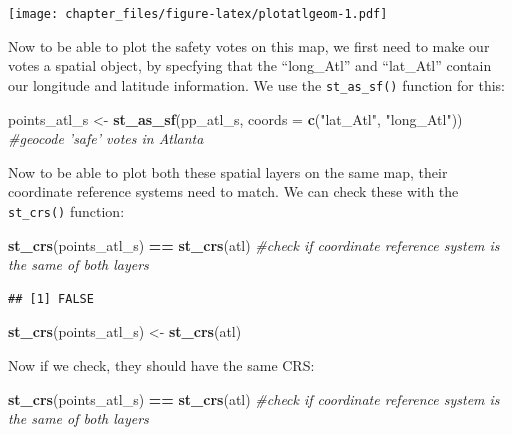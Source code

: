 \documentclass[
]{article}
\newenvironment{Shaded}{\begin{snugshade}}{\end{snugshade}}
\newcommand{\CommentTok}[1]{\textcolor[rgb]{0.56,0.35,0.01}{\textit{#1}}}
\newcommand{\DataTypeTok}[1]{\textcolor[rgb]{0.13,0.29,0.53}{#1}}
\newcommand{\KeywordTok}[1]{\textcolor[rgb]{0.13,0.29,0.53}{\textbf{#1}}}
\newcommand{\NormalTok}[1]{#1}
\newcommand{\OperatorTok}[1]{\textcolor[rgb]{0.81,0.36,0.00}{\textbf{#1}}}
\newcommand{\StringTok}[1]{\textcolor[rgb]{0.31,0.60,0.02}{#1}}
\begin{document}
\texttt{[image: chapter\_files/figure-latex/plotatlgeom-1.pdf]}

Now to be able to plot the safety votes on this map, we first need to
make our votes a spatial object, by specfying that the ``long\_Atl'' and
``lat\_Atl'' contain our longitude and latitude information. We use the
\texttt{st\_as\_sf()} function for this:

\begin{Shaded}
\begin{Highlighting}[]
\NormalTok{points_atl_s <-}\StringTok{ }\KeywordTok{st_as_sf}\NormalTok{(pp_atl_s, }\DataTypeTok{coords =} \KeywordTok{c}\NormalTok{(}\StringTok{"lat_Atl"}\NormalTok{, }\StringTok{"long_Atl"}\NormalTok{)) }\CommentTok{#geocode 'safe' votes in Atlanta}
\end{Highlighting}
\end{Shaded}

Now to be able to plot both these spatial layers on the same map, their
coordinate reference systems need to match. We can check these with the
\texttt{st\_crs()} function:

\begin{Shaded}
\begin{Highlighting}[]
\KeywordTok{st_crs}\NormalTok{(points_atl_s) }\OperatorTok{==}\StringTok{ }\KeywordTok{st_crs}\NormalTok{(atl) }\CommentTok{#check if coordinate reference system is the same of both layers}
\end{Highlighting}
\end{Shaded}

\begin{verbatim}
## [1] FALSE
\end{verbatim}

\begin{Shaded}
\begin{Highlighting}[]
\KeywordTok{st_crs}\NormalTok{(points_atl_s) <-}\StringTok{ }\KeywordTok{st_crs}\NormalTok{(atl)}
\end{Highlighting}
\end{Shaded}

Now if we check, they should have the same CRS:

\begin{Shaded}
\begin{Highlighting}[]
\KeywordTok{st_crs}\NormalTok{(points_atl_s) }\OperatorTok{==}\StringTok{ }\KeywordTok{st_crs}\NormalTok{(atl) }\CommentTok{#check if coordinate reference system is the same of both layers}
\end{Highlighting}
\end{Shaded}
\end{document}
